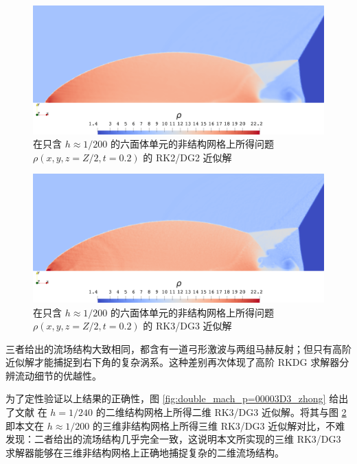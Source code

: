 \begin{figure}[h!]
\begin{centering}
\includegraphics[width=1\textwidth]{../mdpi/figures/double_mach/p=2_h=5e-3}
\par\end{centering}
\caption{\label{fig:double_mach_p=00003D2_h=00003D5e-3}在只含 $h\approx1/200$
的六面体单元的非结构网格上所得问题
$\rho(x,y,z=Z/2,t=0.2)$ 的 RK2/DG2 近似解}
\end{figure}

\begin{figure}[h!]
\begin{centering}
\includegraphics[width=1\textwidth]{../mdpi/figures/double_mach/p=3_h=5e-3}
\par\end{centering}
\caption{\label{fig:double_mach_p=00003D3_h=00003D5e-3}在只含 $h\approx1/200$
的六面体单元的非结构网格上所得问题
$\rho(x,y,z=Z/2,t=0.2)$ 的 RK3/DG3 近似解}
\end{figure}

三者给出的流场结构大致相同，都含有一道弓形激波与两组马赫反射；但只有高阶近似解才能捕捉到右下角的复杂涡系。这种差别再次体现了高阶 RKDG
求解器分辨流动细节的优越性。

为了定性验证以上结果的正确性，图 \ref{fig:double_mach_p=00003D3_zhong} 给出了文献 \cite{Zhong_2013}
在 $h=1/240$ 的二维结构网格上所得二维 RK3/DG3 近似解。将其与图 \ref{fig:double_mach_p=00003D3_h=00003D5e-3}
即本文在 $h\approx1/200$ 的三维非结构网格上所得三维 RK3/DG3 近似解对比，不难发现：二者给出的流场结构几乎完全一致，这说明本文所实现的三维
RK3/DG3 求解器能够在三维非结构网格上正确地捕捉复杂的二维流场结构。

